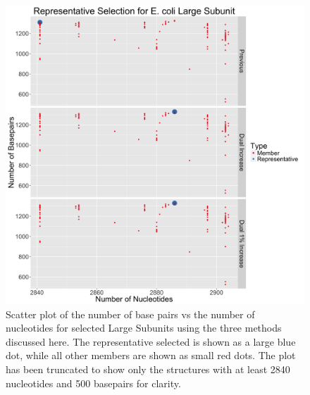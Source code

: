 \begin{figure}
  \includegraphics[width=\linewidth]{chapter-4/figs/ec-lsu-rep}
  \caption{Scatter plot of the number of base pairs vs the number of nucleotides
    for selected \EC{} Large Subunits using the three methods discussed here.
    The representative selected is shown as a large blue dot, while all other
    members are shown as small red dots. The plot has been truncated to show
    only the structures with at least 2840 nucleotides and 500 basepairs for
  clarity.}
  \label{fig:ec-lsu-rep}
\end{figure}

